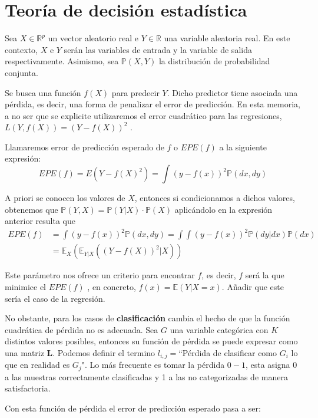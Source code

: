 \section{Teoría de decisión estadística}
Sea $X\in \mathbb{R}^p$ un vector aleatorio real e $Y \in \mathbb{R}$ una variable aleatoria real. En este contexto, $X$ e $Y$ serán las variables de entrada y la variable de salida respectivamente. Asimismo, sea $\mathbb{P}(X,Y)$ la distribución de probabilidad conjunta.   

Se busca una función $f(X)$ para predecir $Y$. Dicho predictor tiene asociada una pérdida, es decir, una forma de penalizar el error de predicción. En esta memoria, a no ser que se explicite utilizaremos el error cuadrático para las regresiones, $L(Y,f(X))=(Y-f(X))^2$ . 

\begin{defi}
Llamaremos error de predicción esperado de $f$ o $EPE(f)$ a la siguiente expresión:
\begin{equation}
EPE(f)=E(Y-f(X)^2)=\int (y-f(x))^2 \mathbb{P}(dx,dy)
\end{equation}

\noindent A priori se conocen los valores de $X$, entonces si condicionamos a dichos valores, obtenemos que $\mathbb{P}(Y,X)=\mathbb{P}(Y|X)\cdot\mathbb{P}(X)$ aplicándolo en la expresión anterior resulta que 
\begin{equation}
\begin{split}
EPE(f)&=\int (y-f(x))^2 \mathbb{P}(dx,dy)=\int\int (y-f(x))^2 \mathbb{P}(dy|dx)\mathbb{P}(dx)\\
&= \mathbb{E}_X(\mathbb{E}_{Y|X}((Y-f(X))^2|X))
\end{split}
\end{equation}

\end{defi}

\noindent Este parámetro nos ofrece un criterio para encontrar $f$, es decir, $f$ será la que minimice el $EPE(f)$ , en concreto, $f(x)=\mathbb{E}(Y|X=x)$. Añadir que este sería el caso de la regresión. 

\noindent No obstante, para los casos de \textbf{clasificación} cambia el hecho de que la función cuadrática de pérdida no es adecuada. Sea $G$ una variable categórica con $K$ distintos valores posibles, entonces su función de pérdida se puede expresar como una matriz \textbf{L}. Podemos definir el termino $l_{i,j}=$``Pérdida de clasificar como $G_i$ lo que en realidad es  $G_j$". Lo más frecuente es tomar la pérdida $0-1$, esta asigna 0 a las muestras correctamente clasificadas y 1 a las no categorizadas de manera satisfactoria. 

\noindent Con esta función de pérdida el error de predicción esperado pasa a ser: 
